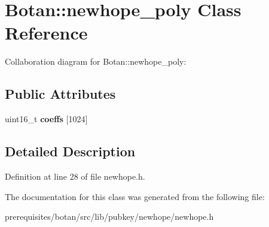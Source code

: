 \hypertarget{class_botan_1_1newhope__poly}{}\section{Botan\+:\+:newhope\+\_\+poly Class Reference}
\label{class_botan_1_1newhope__poly}


Collaboration diagram for Botan\+:\+:newhope\+\_\+poly\+:
\subsection*{Public Attributes}
\begin{DoxyCompactItemize}
\item 
\mbox{\label{class_botan_1_1newhope__poly_a86ee8d64d92642ac9a19e601463e82b2}} 
uint16\+\_\+t {\bfseries coeffs} \mbox{[}1024\mbox{]}
\end{DoxyCompactItemize}


\subsection{Detailed Description}


Definition at line 28 of file newhope.\+h.



The documentation for this class was generated from the following file\+:\begin{DoxyCompactItemize}
\item 
prerequisites/botan/src/lib/pubkey/newhope/newhope.\+h\end{DoxyCompactItemize}
